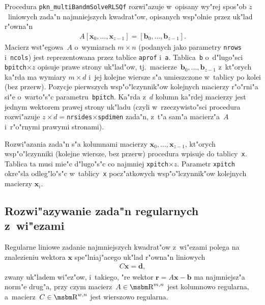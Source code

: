 \newpage
{}
\begin{sloppypar}
Procedura \texttt{pkn\_multiBandmSolveRLSQf} rozwi"azuje w~opisany wy"rej spos"ob
$z$~liniowych zada"n najmniejszych kwad\-ra\-t"ow, opisanych wsp"olnie przez
uk"lad r"owna"n
\begin{align*}
  A[\bm{x}_0,\ldots,\bm{x}_{z-1}] = [\bm{b}_0,\ldots,\bm{b}_{z-1}].
\end{align*}
Macierz wst"egowa~$A$ o~wymiarach $m\times n$ (podanych jako parametry
\texttt{nrows} i~\texttt{ncols}) jest reprezentowana przez tablice
\texttt{aprof} i~\texttt{a}. Tablica~\texttt{b} o~d"lugo"sci
\texttt{bpitch}$\times z$ opisuje prawe strony uk"lad"ow,
tj.\ macierze~$\bm{b}_0,\ldots,\bm{b}_{z-1}$ z~kt"orych ka"rda ma
wymiary $m\times d$ i~jej kolejne wiersze s"a umieszczone w~tablicy
po kolei (bez przerw). Pozycje pierwszych wsp"o"lczynnik"ow kolejnych
macierzy r"o"rni"a si"e o~warto"s"c parametru~\texttt{bpitch}.
Ka"rda z~$d$ kolumn ka"rdej macierzy jest jednym wektorem prawej
strony uk"ladu (czyli w~rzeczywisto"sci procedura rozwi"azuje
$z\times d={}$\texttt{nrsides}$\times$\texttt{spdimen} zada"n,
z~t"a sam"a macierz"a~$A$ i~r"o"rnymi prawymi stronami).
\end{sloppypar}

Rozwi"azania zada"n s"a kolumnami macierzy $\bm{x}_0,\ldots,\bm{x}_{z-1}$,
kt"orych wsp"o"lczynniki (kolejne wiersze, bez przerw) procedura wpisuje do
tablicy~\texttt{x}. Tablica ta musi mie"c d"lugo"s"c co najmniej
\texttt{xpitch}$\times z$. Parametr \texttt{xpitch} okre"sla odleg"lo"s"c
w~tablicy~\texttt{x} pocz"atkowych wsp"o"lczynnik"ow kolejnych macierzy
$\bm{x}_i$.


\subsection{Rozwi"azywanie zada"n regularnych z~wi"ezami}

Regularne liniowe zadanie najmniejszych kwadrat"ow z~wi"ezami polega na
znalezieniu wektora $\bm{x}$ spe"lniaj"acego uk"lad r"owna"n liniowych
\begin{align*}
  C\bm{x} = \bm{d},
\end{align*}
zwany uk"ladem wi"ez"ow,  i~takiego, "re wektor $\bm{r}=A\bm{x}-\bm{b}$ ma
najmniejsz"a norm"e drug"a, przy czym macierz~$A\in\R^{m,n}$ jest kolumnowo
regularna, a~macierz~$C\in\R^{w,n}$ jest wierszowo regularna.


